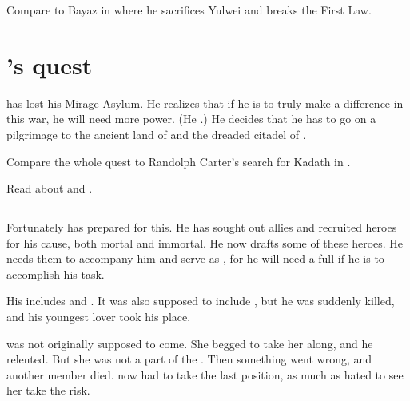 Compare to Bayaz in \cite{JoeAbercrombie:LastArgumentofKings} where he sacrifices Yulwei and breaks the First Law. 















\section{\Ishnaruchaefir's quest}
\Ishnaruchaefir has lost his Mirage Asylum. 
He realizes that if he is to truly make a difference in this war, he will need more power.
(He .)
He decides that he has to go on a pilgrimage to the ancient \draconian land of \Dragonland and the dreaded citadel of . 

Compare the whole quest to Randolph Carter's search for Kadath in \cite{HPLovecraft:TheDreamQuestofUnknownKadath}. 

Read about  and .









\subsection{\Matrix}
Fortunately \Ishnaruchaefir has prepared for this. 
He has sought out allies and recruited heroes for his cause, both mortal and immortal. 
He now drafts some of these heroes.
He needs them to accompany him and serve as \vertices, for he will need a full  if he is to accomplish his task. 

His \matrix includes  and .
It was also supposed to include , but he was suddenly killed, and his youngest lover  took his place. 

\Criseis was not originally supposed to come.
She begged \Ishnaruchaefir to take her along, and he relented.
But she was not a part of the \matrix.
Then something went wrong, and another \matrix member died.
\Criseis now had to take the last position, as much as \Ishnaruchaefir hated to see her take the risk. 









